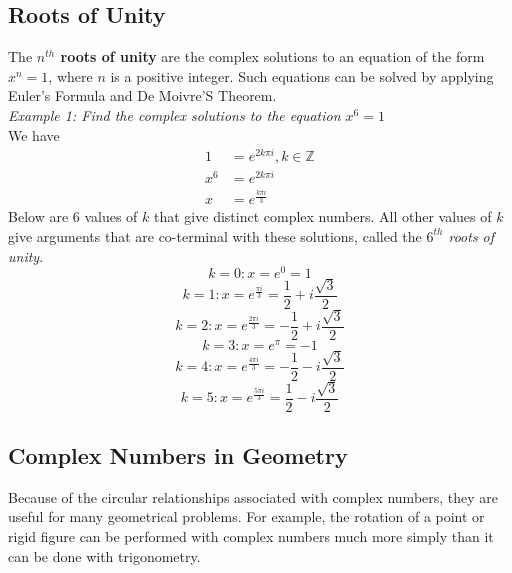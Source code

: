     \subsection{Roots of Unity}

        The \textbf{$n^{th}$ roots of unity} are the complex solutions to an equation of the form
        $x^n=1$, where $n$ is a positive integer. Such equations can be solved by applying
        Euler's Formula and De Moivre'S Theorem. \\

        \noindent \textit{Example 1: Find the complex solutions to the equation $x^6=1$} \\
        We have \\
        \begin{align*}
            1 &= e^{2k\pi i},k\in\mathbb{Z} \\
            x^6 &= e^{2k\pi i} \\
            x &= e^{\frac{k\pi i}{3}}
        \end{align*}
        \noindent Below are 6 values of $k$ that give distinct complex numbers.
        All other values of $k$ give arguments that are co-terminal with these solutions,
        called the \textit{$6^{th}$ roots of unity}. \\

        \begin{equation*}
            k=0: x=e^0 = 1
        \end{equation*}
        \begin{equation*}
            k=1: x=e^{\frac{\pi i}{3}} = \frac{1}{2}+i\frac{\sqrt{3}}{2}
        \end{equation*}
        \begin{equation*}
            k=2: x=e^{\frac{2\pi i}{3}} = -\frac{1}{2}+i\frac{\sqrt{3}}{2}
        \end{equation*}
        \begin{equation*}
            k=3: x=e^{\pi} = -1
        \end{equation*}
        \begin{equation*}
            k=4: x=e^{\frac{4\pi i}{3}} = -\frac{1}{2}-i\frac{\sqrt{3}}{2}
        \end{equation*}
        \begin{equation*}
            k=5: x=e^{\frac{5\pi i}{3}} = \frac{1}{2} - i\frac{\sqrt{3}}{2}
        \end{equation*}



    \subsection{Complex Numbers in Geometry}
        Because of the circular relationships associated with complex numbers, they are useful
        for many geometrical problems. For example, the rotation of a point or rigid figure
        can be performed with complex numbers much more simply than it can be done with trigonometry. \\

